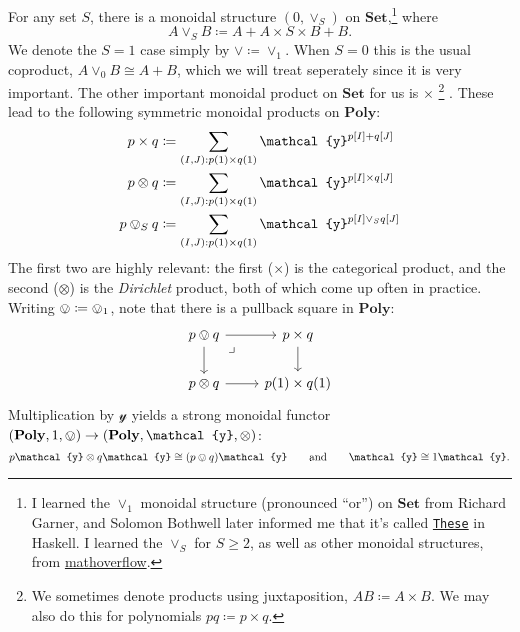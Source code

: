 \documentclass[11pt, one side, article]{memoir}
\theoremstyle{definition}
\theoremstyle{plain}
\newcommand{\Cat}[1]{\mathbf{#1}}%
\newcommand{\tn}[1]{\textnormal{#1}}
\newcommand{\smset}{\Cat{Set}}
\newcommand{\yon}{\mathcal{y}}
\newcommand{\poly}{\Cat{Poly}}
\newcommand{\0}{\textsf{0}}
\newcommand{\1}{\tn{\textsf{1}}}
\newcommand{\othis}[1]{\tikz[baseline=(char.base)]{
            \node[shape=circle,draw,inner sep=1pt] (char) {\tiny #1};}}
\newcommand{\bang}{\,\mathbin{!}\,}
\newcommand{\obang}{\mathbin{\othis{!}}}
\newcommand{\qqand}{\qquad\text{and}\qquad}
\begin{document}
For any set $S$, there is a monoidal structure $(0,\vee_S)$ on $\smset$,\footnote{I learned the $\vee_1$ monoidal structure (pronounced ``or'') on $\smset$ from Richard Garner, and Solomon Bothwell later informed me that it's called \href{https://hackage.haskell.org/package/these}{\texttt{These}} in Haskell. I learned the $\vee_S$ for $S\geq 2$, as well as other monoidal structures, from \href{https://mathoverflow.net/questions/155939/what-other-monoidal-structures-exist-on-the-category-of-sets}{mathoverflow}.}
 where
\begin{equation}
	A\vee_SB\coloneqq A+A\times S\times B + B.
\end{equation}
We denote the $S=1$ case simply by $\vee\coloneqq\vee_1$. When $S=0$ this is the usual coproduct, $A\vee_0B\cong A+B$, which we will treat seperately since it is very important. The other important monoidal product on $\smset$ for us is $\times$%
\footnote{
	We sometimes denote products using juxtaposition, $AB\coloneqq A\times B$. We may also do this for polynomials $pq\coloneqq p\times q$.
}%
.
These lead to the following symmetric monoidal products on $\poly$:
\begin{align}
\label{eqn.times}
	p\times q&\coloneqq\sum_{(I,J): p(1)\times q(1)}\yon^{p[I]+ q[J]}\\
\label{eqn.otimes}
	p\otimes q&\coloneqq\sum_{(I,J): p(1)\times q(1)}\yon^{p[I]\times q[J]}\\
\label{eqn.ovee}
	p\ovee_S q&\coloneqq\sum_{(I,J): p(1)\times q(1)}\yon^{p[I]\vee_S q[J]}
\end{align}
The first two are highly relevant: the first ($\times$) is the categorical product, and the second ($\otimes$) is the \emph{Dirichlet} product, both of which come up often in practice. Writing $\ovee\coloneqq\ovee_1$, note that there is a pullback square in $\poly$:
\begin{equation}
\begin{tikzcd}
	p\ovee q\ar[r]\ar[d]&
	p\times q\ar[d]\\
	p\otimes q\ar[r]&
	p(1)\times q(1)\ar[ul, phantom, very near end, "\lrcorner"]
\end{tikzcd}
\end{equation}
Multiplication by $\yon$ yields a strong monoidal functor $(\poly,1,\ovee)\to(\poly,\yon,\otimes)$:
\begin{equation}
	p\yon\otimes q\yon\cong (p\ovee q)\yon
	\qqand
	\yon\cong 1\yon.
\end{equation}
\end{document}
